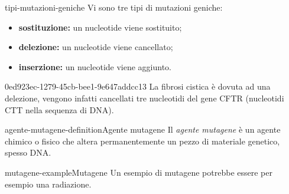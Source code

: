 \documentclass[preview]{standalone}
\begin{document}
\begin{snippet}{tipi-mutazioni-geniche}
    Vi sono tre tipi di mutazioni geniche:
    \begin{itemize}
        \item \textbf{sostituzione:} un nucleotide viene sostituito;
        \item \textbf{delezione:} un nucleotide viene cancellato;
        \item \textbf{inserzione:} un nucleotide viene aggiunto.
    \end{itemize}
\end{snippet}

\begin{snippet}{0ed923ec-1279-45cb-bee1-9e647addcc13}
    La fibrosi cistica è dovuta ad una delezione, vengono infatti cancellati tre nucleotidi
    del gene CFTR (nucleotidi CTT nella sequenza di DNA).
\end{snippet}

\begin{snippetdefinition}{agente-mutagene-definition}{Agente mutagene}
    Il \textit{agente mutagene} è un agente chimico o fisico che altera permanentemente
    un pezzo di materiale genetico, spesso DNA.
\end{snippetdefinition}


\begin{snippetexample}{mutagene-example}{Mutagene}
    Un esempio di mutagene potrebbe essere per esempio una radiazione.
\end{snippetexample}
\end{document}
